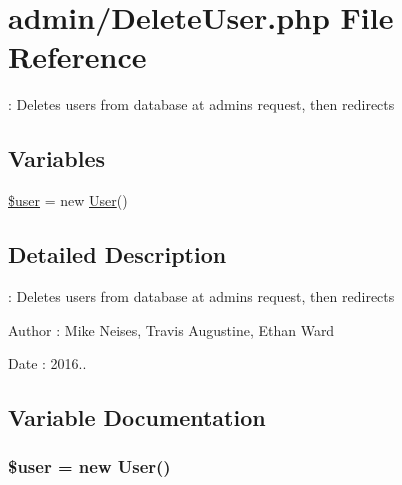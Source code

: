 \hypertarget{_delete_user_8php}{}\section{admin/\+Delete\+User.php File Reference}
\label{_delete_user_8php}


\+: Deletes users from database at admin\textquotesingle{}s request, then redirects  


\subsection*{Variables}
\begin{DoxyCompactItemize}
\item 
\hyperlink{_delete_user_8php_a598ca4e71b15a1313ec95f0df1027ca5}{\$user} = new \hyperlink{class_user}{User}()
\end{DoxyCompactItemize}


\subsection{Detailed Description}
\+: Deletes users from database at admin\textquotesingle{}s request, then redirects 

\begin{DoxyAuthor}{Author}
\+: Mike Neises, Travis Augustine, Ethan Ward 
\end{DoxyAuthor}
\begin{DoxyDate}{Date}
\+: 2016.. 
\end{DoxyDate}


\subsection{Variable Documentation}
\subsubsection[{\texorpdfstring{\$user}{$user}}]{\setlength{\rightskip}{0pt plus 5cm}\$user = new {\bf User}()}\hypertarget{_delete_user_8php_a598ca4e71b15a1313ec95f0df1027ca5}{}\label{_delete_user_8php_a598ca4e71b15a1313ec95f0df1027ca5}
